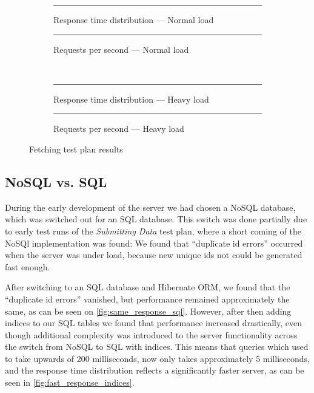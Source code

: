 \begin{figure}[!htb]
    \centering
    \begin{subfigure}[b]{0.5\textwidth}
        \centering
        \rule{5cm}{5cm}
        \caption{Response time distribution --- Normal load}\label{fig:fetch_resp_t_dist}
    \end{subfigure}\hfill%
    \begin{subfigure}[b]{0.5\textwidth}
        \centering
        \rule{5cm}{5cm}
        \caption{Requests per second --- Normal load}\label{fig:fetch_reqs_p_sec}
    \end{subfigure}\\
    \begin{subfigure}[b]{0.5\textwidth}
        \centering
        \rule{5cm}{5cm}
        \caption{Response time distribution --- Heavy load}\label{fig:fetch_resp_t_dist_heavy}
    \end{subfigure}\hfill%
    \begin{subfigure}[b]{0.5\textwidth}
        \centering
        \rule{5cm}{5cm}
        \caption{Requests per second --- Heavy load}\label{fig:fetch_reqs_p_sec_heavy}
    \end{subfigure}
    \caption{Fetching test plan results}\label{fig:fetch_test_results}
\end{figure}

\subsection{NoSQL vs. SQL}\label{subsec:nosql_vs._sql}
During the early development of the server we had chosen a NoSQL database, which was switched out for an SQL database.
This switch was done partially due to early test runs of the \textit{Submitting Data} test plan, where a short coming of the NoSQl implementation was found:
We found that \enquote{duplicate id errors} occurred when the server was under load, because new unique ids not could be generated fast enough.

After switching to an SQL database and Hibernate ORM, we found that the \enquote{duplicate id errors} vanished, but performance remained approximately the same, as can be seen on \cref{fig:same_response_sql}.
However, after then adding indices to our SQL tables we found that performance increased drastically, even though additional complexity was introduced to the server functionality across the switch from NoSQL to SQL with indices.
This means that queries which used to take upwards of 200 milliseconds, now only takes approximately 5 milliseconds, and the response time distribution reflects a significantly faster server, as can be seen in \cref{fig:fast_response_indices}.


